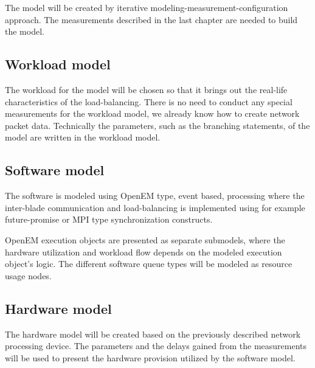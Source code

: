 The model will be created by iterative modeling-measurement-configuration approach. The measurements described in the last chapter are needed to build the model.

\subsection{Workload model}
The workload for the model will be chosen so that it brings out the real-life characteristics of the load-balancing. There is no need to conduct any special measurements for the workload model, we already know how to create network packet data. Technically the parameters, such as the branching statements, of the model are written in the workload model.

\subsection{Software model}
The software is modeled using OpenEM type, event based, processing where the inter-blade communication and load-balancing is implemented using for example future-promise or MPI type synchronization constructs.

OpenEM execution objects are presented as separate submodels, where the hardware utilization and workload flow depends on the modeled execution object's logic. The different software queue types will be modeled as resource usage nodes.

\subsection{Hardware model}
The hardware model will be created based on the previously described network processing device. The parameters and the delays gained from the measurements will be used to present the hardware provision utilized by the software model.

